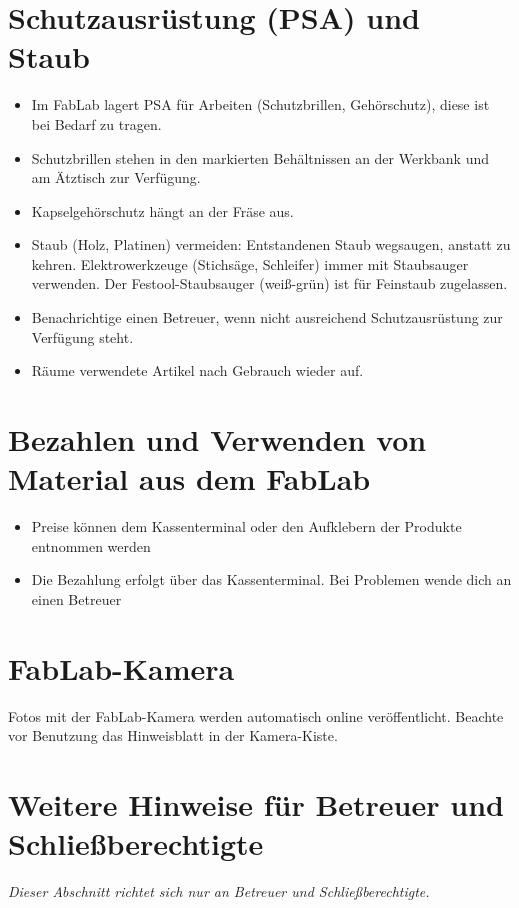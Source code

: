 \documentclass[13pt]{\basedir/fablab-document}
\begin{document}
\section{Schutzausrüstung (PSA) und Staub}
\begin{itemize}
	\item Im FabLab lagert PSA für Arbeiten (Schutzbrillen, Gehörschutz), diese ist bei Bedarf zu tragen.
	\item Schutzbrillen stehen in den markierten Behältnissen an der Werkbank und am Ätztisch zur Verfügung.
	\item Kapselgehörschutz hängt an der Fräse aus.
	\item Staub (Holz, Platinen) vermeiden: Entstandenen Staub wegsaugen, anstatt zu kehren. Elektrowerkzeuge (Stichsäge, Schleifer) immer mit Staubsauger verwenden. Der Festool-Staubsauger (weiß-grün) ist für Feinstaub zugelassen.
	\item Benachrichtige einen Betreuer, wenn nicht ausreichend Schutzausrüstung zur Verfügung steht.
	\item Räume verwendete Artikel nach Gebrauch wieder auf.
\end{itemize}



\section{Bezahlen und Verwenden von Material aus dem FabLab}
\begin{itemize}
	\item Preise können dem Kassenterminal oder den Aufklebern der Produkte entnommen werden
	\item Die Bezahlung erfolgt über das Kassenterminal. Bei Problemen wende dich an einen Betreuer
	
\end{itemize}

\section{FabLab-Kamera}
Fotos mit der FabLab-Kamera werden automatisch online veröffentlicht. Beachte vor Benutzung das Hinweisblatt in der Kamera-Kiste.

\newpage
\section{Weitere Hinweise für Betreuer und Schließberechtigte}
\textit{Dieser Abschnitt richtet sich nur an Betreuer und Schließberechtigte.}
\end{document}
